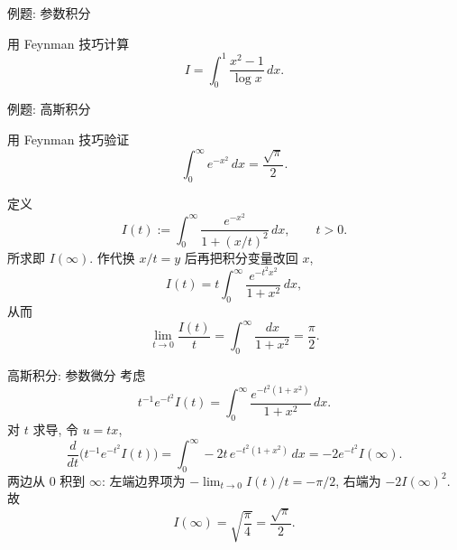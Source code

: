 \documentclass[fontset=windows, chinese, 10pt]{beamer}
\begin{document}
\begin{frame}{例题: 参数积分}
\small
\begin{example}
用 Feynman 技巧计算
\[
I=\int_0^1\frac{x^2-1}{\log x}\,dx.
\]
\end{example}
\end{frame}

\begin{frame}{例题: 高斯积分}
\small
\begin{example}
用 Feynman 技巧验证
\[
\int_0^{\infty}e^{-x^2}\,dx=\frac{\sqrt{\pi}}{2}.
\]
\end{example}
定义
\[
I(t):=\int_0^{\infty}\frac{e^{-x^2}}{1+(x/t)^2}\,dx,\qquad t>0.
\]
所求即 $I(\infty)$. 作代换 $x/t=y$ 后再把积分变量改回 $x$,
\[
I(t)=t\int_0^{\infty}\frac{e^{-t^2 x^2}}{1+x^2}\,dx,
\]
从而
\[
\lim_{t\to 0}\frac{I(t)}{t}=\int_0^{\infty}\frac{dx}{1+x^2}=\frac{\pi}{2}.
\]
\end{frame}

\begin{frame}{高斯积分: 参数微分}
\small
考虑
\[
t^{-1}e^{-t^2}I(t)=\int_0^{\infty}\frac{e^{-t^2(1+x^2)}}{1+x^2}\,dx.
\]
对 $t$ 求导, 令 $u=tx$,
\[
\frac{d}{dt}\bigl(t^{-1}e^{-t^2}I(t)\bigr)
=\int_0^{\infty}-2t\,e^{-t^2(1+x^2)}\,dx
=-2e^{-t^2}I(\infty).
\]
两边从 $0$ 积到 $\infty$: 左端边界项为 $-\lim_{t\to 0}I(t)/t=-\pi/2$, 右端为 $-2I(\infty)^2$. 故
\[
I(\infty)=\sqrt{\frac{\pi}{4}}=\frac{\sqrt{\pi}}{2}.
\]
\end{frame}


\end{document}
